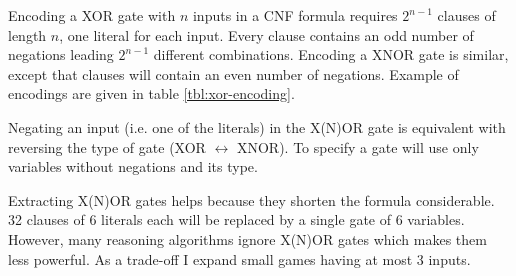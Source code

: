 \begin{table}
  \centering

  \caption{XOR/XNOR gates}
  \label{tbl:xor-formula}
\end{table}

Encoding a XOR gate with $n$ inputs in a CNF formula requires
$2^{n-1}$ clauses of length $n$, one literal for each input.
Every clause contains an odd number of negations leading $2^{n-1}$
different combinations. Encoding a XNOR gate is similar, except
that clauses will contain an even number of negations. Example
of encodings are given in table \ref{tbl:xor-encoding}.

Negating an input (i.e. one of the literals) in the X(N)OR gate
is equivalent with reversing the type of gate (XOR $\leftrightarrow$ XNOR).
To specify a gate will use only variables without negations and its type.

Extracting X(N)OR gates helps because they shorten the formula
considerable. 32 clauses of 6 literals each will be replaced by
a single gate of 6 variables.  However, many reasoning algorithms
ignore X(N)OR gates which makes them less powerful. As a trade-off I
expand small games having at most 3 inputs.

\begin{table}
  \centering

  \caption{Examples of encoding a XOR gate with 2 inputs and XNOR gate with
  3 inputs}
  \label{tbl:xor-encoding}
\end{table}

